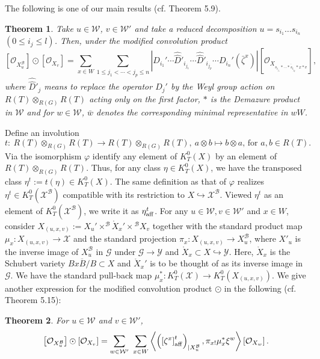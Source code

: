\documentclass{article}
\newtheorem{theorem}{Theorem}[section]
\def\G{\mathcal{G}}
\def\X{\mathcal{X}}
\def\B{\mathcal{B}}
\def\W{\mathcal{W}}
\def\Y{\mathcal{Y}}
\def\ref#1{#1}
\def\aff{\rm{aff}}
\begin{document}
The following is one of our main results (cf. Theorem \ref{5.9}). 
\begin{theorem}\label{1.7}
Take $u\in \W$, $v\in \W'$ and take a reduced decomposition $u=s_{i_1}\ldots s_{i_n}$\,  $\left(0\leq i_j\leq l\right)$. Then, under the modified convolution product
$$
\left[ \mathcal{O}_{X^\B_u}\right] \odot \left[ \mathcal{O}_{X_v}\right] = \sum_{x\in W} \sum_{1\leq j_1< \cdots <j_p\leq n} \left\vert D_{i_1}' \cdots \hat{\hat{D}}'_{i_{j_1}}\cdots \hat{\hat{D}}'_{i_{j_p}} \cdots D_{i_n}'\left(\bar{\zeta}^x \right)\right\vert [ \mathcal{O}_{X_{\overline{s_{i_{j_1}}*\cdots *s_{i_{j_p}}*x*v}}}],
$$
where $\hat{\hat{D}}'_j$ means to replace the operator $D_j'$ by the Weyl
group action on $R(T) \otimes_{R(G)} R(T)$ acting only on the first factor, $*$ is the Demazure product in $\W$  and for $w\in \W$, $\bar{w}$ denotes the corresponding minimal representative in $wW$. 
\end{theorem}
Define an involution 
$$
t:~R(T)\otimes_{R(G)}R(T) \rightarrow R(T)\otimes_{R(G)}R(T) ,~a\otimes b \mapsto b\otimes a,\,\mbox{for } a,b\in R(T).
$$
Via the isomorphism $\varphi$ identify any element of $K_T^0(X)$ by an element of $R(T)\otimes_{R(G)}R(T)$. 
Thus, for any class $\eta\in K_T^0(X)$, we have the transposed class $\eta^t := t(\eta) \in K_T^0 (X)$. The same definition as that of $\varphi$ realizes $\eta^t\in  K_T^0\left(\X^{\B}\right)$ compatible with its restriction to $X\hookrightarrow \X^\B$. Viewed $\eta^t$ as an element of $K_T^0\left(\X^{\B}\right)$, we write it as $\eta^t_{\aff}$. 
For any $u\in \W, v\in \W'$ and $x\in W$, consider 
$ X_{(u,x,v)} := X_u' \times^{\B}\mathring{X}_x' \times{^\B} X_v $
 together with the standard product map $\mu_x:X_{(u,x,v)}\rightarrow\X$ and the standard projection $\pi_x: X_{(u,x,v)}\rightarrow X_{u}^\B$, where $X'_u$ is the inverse image of $X_u^\B$ in $\G$ under $\G\rightarrow \Y$ and 
$\mathring{X}_x \subset X\hookrightarrow \Y.$ Here, $\mathring{X}_x$ is the Schubert variety $\overline{BxB/B} \subset X$ and $\mathring{X}_x'$ is to be thought of as its inverse image in $\G$. 
We have the standard pull-back map
$
\mu_x^*:K_T^0\left(\X\right) \rightarrow K_T^0\left( X_{(u,x,v)}\right).
$
We give another expression for the modified convolution product $\odot$ in the following (cf. Theorem \ref{5.15}):
\begin{theorem}\label{1.8}
For $u\in\W$ and $v\in\W'$, 
$$
\left[\mathcal{O}_{X_u^\B}\right]\odot\left[\mathcal{O}_{X_v}\right] =\sum_{w\in \W'}\,\,\sum_{x\in W} \left\langle \left( \left[ \zeta^x\right]^t_{\aff} \right)_{|X_u^\B},\pi_{x!}\mu_x^*\xi^w\right\rangle\left[\mathcal{O}_{X_w}\right].
$$
\end{theorem}
\end{document}
